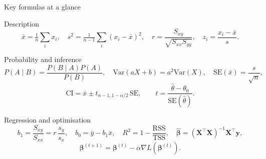\documentclass[aspectratio=169,11pt]{beamer}
\begin{document}
\begin{frame}{Key formulas at a glance}
  \footnotesize
  \begin{block}{Description}
    \[
      \bar x = \tfrac1n\textstyle\sum_i x_i,
      \quad
      s^2 = \tfrac{1}{n-1}\textstyle\sum_i (x_i-\bar x)^2,
      \quad
      r = \frac{S_{xy}}{\sqrt{S_{xx}S_{yy}}},
      \quad
      z_i = \frac{x_i-\bar x}{s}.
    \]
  \end{block}
  \begin{block}{Probability and inference}
    \[
      P(A\mid B) = \frac{P(B\mid A)P(A)}{P(B)},
      \quad
      \mathrm{Var}(aX+b) = a^2\mathrm{Var}(X),
      \quad
      \mathrm{SE}(\bar x) = \frac{s}{\sqrt n},
    \]
    \[
      \text{CI} = \bar x \pm t_{n-1,1-\alpha/2}\,\mathrm{SE},
      \qquad
      t = \frac{\hat\theta - \theta_0}{\mathrm{SE}(\hat\theta)} .
    \]
  \end{block}
  \begin{block}{Regression and optimisation}
    \[
      b_1 = \frac{S_{xy}}{S_{xx}} = r\,\frac{s_y}{s_x},
      \quad b_0 = \bar y - b_1\bar x,
      \quad
      R^2 = 1 - \frac{\mathrm{RSS}}{\mathrm{TSS}},
      \quad
      \hat{\boldsymbol\beta} = (\mathbf{X}^\top\mathbf{X})^{-1}\mathbf{X}^\top\mathbf{y},
    \]
    \[
      \boldsymbol\beta^{(t+1)} = \boldsymbol\beta^{(t)} - \alpha\nabla L(\boldsymbol\beta^{(t)}) .
    \]
  \end{block}
\end{frame}
\end{document}
